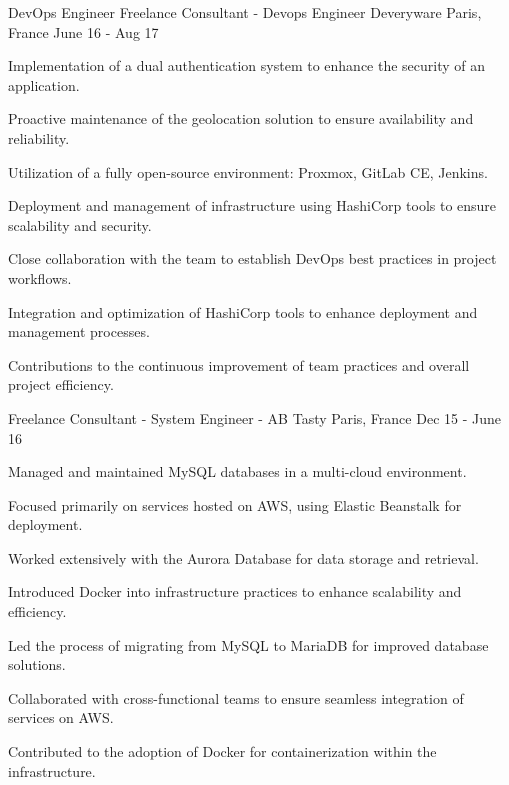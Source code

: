 \begin{cventries}
\cventry
{DevOps Engineer} %
{Freelance Consultant - Devops Engineer}
{Deveryware} %
{Paris, France} %
{June 16 - Aug 17} %
{
  \begin{cvitems} %
    \item {Implementation of a dual authentication system to enhance the security of an application.}
    \item {Proactive maintenance of the geolocation solution to ensure availability and reliability.}
    \item {Utilization of a fully open-source environment: Proxmox, GitLab CE, Jenkins.}
    \item {Deployment and management of infrastructure using HashiCorp tools to ensure scalability and security.}
    \item {Close collaboration with the team to establish DevOps best practices in project workflows.}
    \item {Integration and optimization of HashiCorp tools to enhance deployment and management processes.}
    \item {Contributions to the continuous improvement of team practices and overall project efficiency.}
  \end{cvitems}
}


\cventry
{Freelance Consultant - System Engineer - } %
{AB Tasty} %
{Paris, France} %
{Dec 15 - June 16} %
{
  \begin{cvitems} %
    \item {Managed and maintained MySQL databases in a multi-cloud environment.}
    \item {Focused primarily on services hosted on AWS, using Elastic Beanstalk for deployment.}
    \item {Worked extensively with the Aurora Database for data storage and retrieval.}
    \item {Introduced Docker into infrastructure practices to enhance scalability and efficiency.}
    \item {Led the process of migrating from MySQL to MariaDB for improved database solutions.}
    \item {Collaborated with cross-functional teams to ensure seamless integration of services on AWS.}
    \item {Contributed to the adoption of Docker for containerization within the infrastructure.}
  \end{cvitems}
}


\end{cventries}
